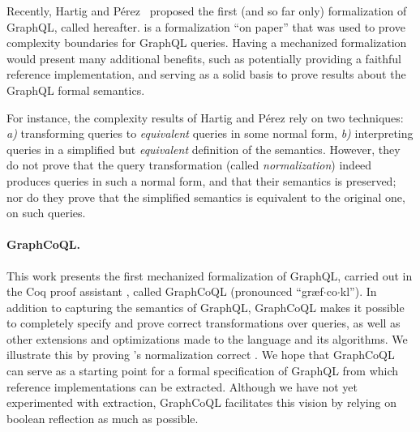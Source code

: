 Recently, Hartig and Pérez~\cite{gqlph} proposed the first (and so far only) formalization of GraphQL, called \HP{} hereafter. 
\HP{} is a formalization ``on paper'' that was used to prove complexity boundaries for GraphQL queries. Having a mechanized formalization would present many additional benefits, such as potentially providing a faithful reference implementation, and serving as a solid basis to prove results about the GraphQL formal semantics. 

For instance, the complexity results of Hartig and Pérez rely on two techniques: {\em a)} transforming queries to {\em equivalent} queries in some  normal form, {\em b)} interpreting queries in a simplified but {\em equivalent} definition of the semantics. However, they do not prove that the query transformation (called {\em normalization}) indeed produces queries in such a normal form, and that their semantics is preserved; nor do they prove that the simplified semantics is equivalent to the original one, on such queries.



\paragraph{GraphCoQL.} This work presents the first mechanized formalization of GraphQL, carried out in the Coq proof assistant , called GraphCoQL (pronounced ``græf$\cdot$co$\cdot$k{\pmschwa}l''). In addition to capturing the semantics of GraphQL, GraphCoQL makes it possible to completely specify and prove correct transformations over queries, as well as other extensions and optimizations made to the language and its algorithms. We illustrate this by proving \HP{}'s normalization  correct .
We hope that GraphCoQL can serve as a starting point for a formal specification of GraphQL from which reference implementations can be extracted. Although we have not yet experimented with extraction, GraphCoQL facilitates this vision by relying on boolean reflection as much as possible.

